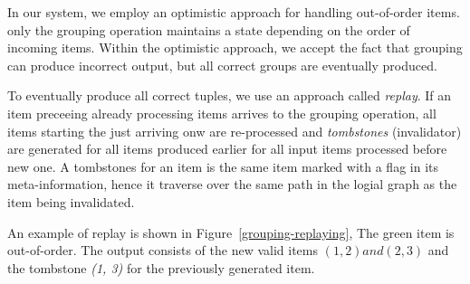 In our system, we employ an optimistic approach for handling out-of-order items.
%
%
only the grouping operation maintains a state depending on the order of incoming items. 
%
Within the  optimistic approach, we accept the fact that grouping can produce incorrect output, but  all correct groups  are eventually produced. 

To eventually produce all correct tuples, we use an approach called {\it replay}. 
If an item preceeing already processing items arrives to the grouping operation, all items starting the just arriving onw are re-processed and {\em tombstones} (invalidator) are generated for all items produced earlier for all input items processed before new one. 
A tombstones for an item is the same item marked with a flag in its meta-information, hence it traverse over the same path in the logial graph as the item being invalidated. 



An example of replay is shown in Figure~\ref{grouping-replaying}, 
The green item is out-of-order. 
The output consists of the new valid items  $(1, 2) and (2, 3)$  and the tombstone {\it (1, 3)} for the previously generated item.

